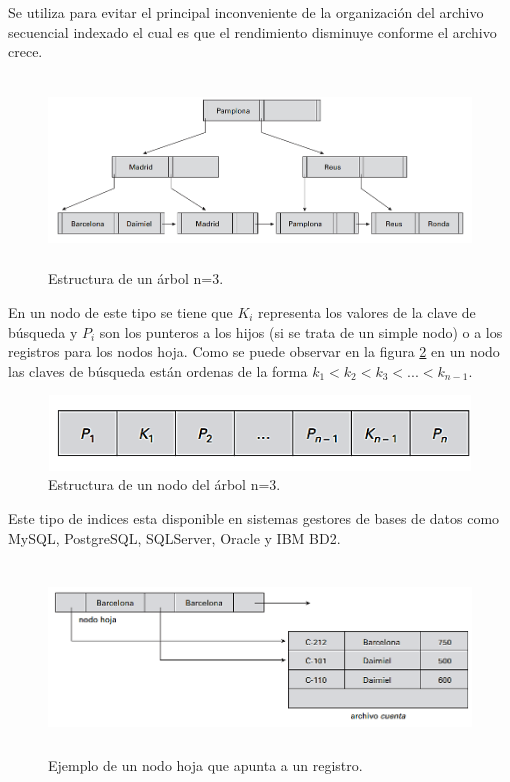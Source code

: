 \documentclass[12pt, titlepage]{article}
\begin{document}
	Se utiliza para evitar el principal inconveniente de la organización del archivo secuencial indexado el cual es que el rendimiento disminuye conforme el archivo crece.
	
	\begin{figure}[H]
		\begin{center}
			\includegraphics[width=16cm, height=5cm]{img/arbol.png}
			\caption{Estructura de un árbol n=3.}
			\label{fig:fd}
		\end{center}
	\end{figure}
En un nodo de este tipo se tiene que $K_{i}$ representa los valores de la clave de búsqueda y $P_{i}$ son los punteros a los hijos (si se trata de un simple nodo) o a los registros para los nodos hoja.
Como se puede observar en la figura \ref{fig:fd4} en un nodo las claves de búsqueda están ordenas de la forma $k_{1} < k_{2} < k_{3} < ... < k_{n-1}$.
\begin{figure}[H]
	\begin{center}
		\includegraphics[width=14cm, height=2cm]{img/nodo.png}
		\caption{Estructura de un nodo del árbol n=3.}
		\label{fig:fd4}
	\end{center}
\end{figure}
Este tipo de indices esta disponible en sistemas gestores de bases de datos como MySQL, PostgreSQL, SQLServer, Oracle y IBM BD2.
\begin{figure}[H]
	\begin{center}
		\includegraphics[width=16cm, height=5cm]{img/hoja.png}
		\caption{Ejemplo de un nodo hoja que apunta a un registro.}
		\label{fig:fd}
	\end{center}
\end{figure}
	
\end{document}
